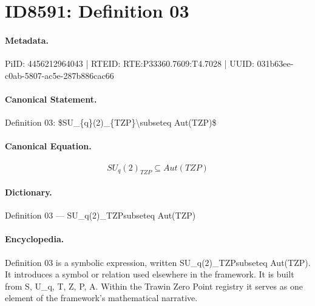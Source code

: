 \section*{ID8591: Definition 03}
\paragraph{Metadata.}
PiID: 4456212964043 | RTEID: RTE:P33360.7609:T4.7028 | UUID: 031b63ee-c0ab-5807-ac5e-287b886cac66

\paragraph{Canonical Statement.}
Definition 03: \$SU\_\{q\}(2)\_\{TZP\}\textbackslash{}subseteq Aut(TZP)\$

\paragraph{Canonical Equation.}
\[
SU_{q}(2)_{TZP}\subseteq Aut(TZP)
\]

\paragraph{Dictionary.}
Definition 03 — SU\_q(2)\_TZPsubseteq Aut(TZP)

\paragraph{Encyclopedia.}
Definition 03 is a symbolic expression, written SU\_q(2)\_TZPsubseteq Aut(TZP). It introduces a symbol or relation used elsewhere in the framework. It is built from S, U\_q, T, Z, P, A. Within the Trawin Zero Point registry it serves as one element of the framework's mathematical narrative.
